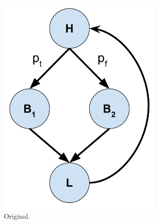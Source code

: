 \begin{figure}
     \centering
     \begin{subfigure}[b]{0.49\textwidth}
         \centering
         \includegraphics[width=0.9\textwidth, height=.33\textheight]{Figures/02-background/simple-loop-cfg.pdf}
         \caption{Original.}
         \label{fig:simple-loop-cfg}
     \end{subfigure}
     \begin{subfigure}[b]{0.49\textwidth}
         \centering

\end{subfigure}
\end{figure}

